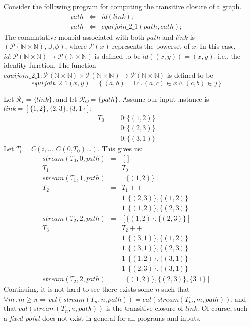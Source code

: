 \begin{example}
Consider the following program for computing the transitive closure of a graph.
\begin{eqnarray*}
  path &\Leftarrow& id(link); \\
  path &\Leftarrow& equijoin\_2\_1(path, path);
\end{eqnarray*}
The commutative monoid associated with both $path$ and $link$ is $(\mathcal{P}(\mathbb{N} \times \mathbb{N}), \cup, \phi)$, where $\mathcal{P}(x)$ represents the powerset of $x$. In this case, $id : \mathcal{P}(\mathbb{N} \times \mathbb{N}) \rightarrow \mathcal{P}(\mathbb{N} \times \mathbb{N})$ is defined to be $id((x,y)) = (x,y)$, i.e., the identity function.  The function $equijoin\_2\_1 : \mathcal{P}(\mathbb{N} \times \mathbb{N}) \times \mathcal{P}(\mathbb{N} \times \mathbb{N}) \rightarrow \mathcal{P}(\mathbb{N} \times \mathbb{N})$ is defined to be 
$$equijoin\_2\_1(x,y) = \{\,(a,b) \,\, | \,\, \exists \, c \, .\,  (a,c) \in x \land (c,b) \in y\,\}$$

\noindent Let $\mathcal{R}_I = \{link\}$, and let $\mathcal{R}_O = \{path\}$.  Assume our input instance is $link = [\{1,2\}, \{2,3\}, \{3,1\}]$:
\begin{eqnarray*}
T_0 & = & 0 : \{(1,2)\} \\
 		&		& 0 : \{(2,3)\} \\
		&		& 0 : \{(3,1)\}
\end{eqnarray*}
Let $T_i = C(i, \ldots, C(0, T_0) \ldots )$. This gives us:
\begin{eqnarray*}
stream(T_0,0,path) & = & [] \\
T_1 & = & T_0 \\
stream(T_1,1,path) & = & [\{(1,2)\}] \\
T_2 & = & T_1 ++ \\
& & 1: \{(2,3)\}, \{(1,2)\} \\
& & 1: \{(1,2)\}, \{(2,3)\} \\
stream(T_2,2,path) & = & [\{(1,2)\}, \{(2,3)\}] \\
T_3 & = & T_2 ++ \\
& & 1: \{(3,1)\}, \{(1,2)\} \\
& & 1: \{(3,1)\}, \{(2,3)\} \\
& & 1: \{(1,2)\}, \{(3,1)\} \\
& & 1: \{(2,3)\}, \{(3,1)\} \\
stream(T_2,2,path) & = & [\{(1,2)\}, \{(2,3)\}, \{3,1\}]
\end{eqnarray*}
Continuing, it is not hard to see there exists some $n$ such that $\forall m \, . \, m \geq n \Rightarrow val(stream(T_n,n,path)) = val(stream(T_m,m,path))$, and that $val(stream(T_n,n,path))$ is the transitive closure of $link$.  Of course, such a {\em fixed point} does not exist in general for all programs and inputs.
\end{example}


